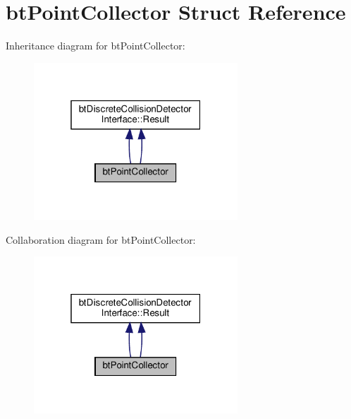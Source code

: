 \hypertarget{structbtPointCollector}{}\section{bt\+Point\+Collector Struct Reference}
\label{structbtPointCollector}


Inheritance diagram for bt\+Point\+Collector\+:
\nopagebreak
\begin{figure}[H]
\begin{center}
\leavevmode
\includegraphics[width=217pt]{structbtPointCollector__inherit__graph}
\end{center}
\end{figure}


Collaboration diagram for bt\+Point\+Collector\+:
\nopagebreak
\begin{figure}[H]
\begin{center}
\leavevmode
\includegraphics[width=217pt]{structbtPointCollector__coll__graph}
\end{center}
\end{figure}
